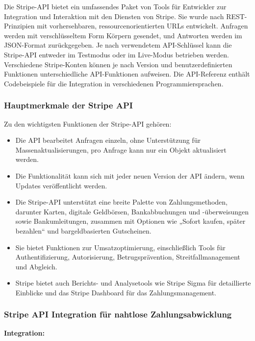 Die Stripe-API bietet ein umfassendes Paket von Tools für Entwickler zur Integration und Interaktion mit den Diensten von Stripe. Sie wurde nach REST-Prinzipien mit vorhersehbaren, ressourcenorientierten URLs entwickelt. Anfragen werden mit verschlüsseltem Form Körpern gesendet, und Antworten werden im JSON-Format zurückgegeben. Je nach verwendetem API-Schlüssel kann die Stripe-API entweder im Testmodus oder im Live-Modus betrieben werden. Verschiedene Stripe-Konten können je nach Version und benutzerdefinierten Funktionen unterschiedliche API-Funktionen aufweisen. Die API-Referenz enthält Codebeispiele für die Integration in verschiedenen Programmiersprachen\cite{Stripe-API:o.J}.

\subsubsection{Hauptmerkmale der Stripe API}
Zu den wichtigsten Funktionen der Stripe-API gehören:

\begin{itemize}
	\item Die API bearbeitet Anfragen einzeln, ohne Unterstützung für Massenaktualisierungen, pro Anfrage kann nur ein Objekt aktualisiert werden.
	\item Die Funktionalität kann sich mit jeder neuen Version der API ändern, wenn Updates veröffentlicht werden.
	\item Die Stripe-API unterstützt eine breite Palette von Zahlungsmethoden, darunter Karten, digitale Geldbörsen, Bankabbuchungen und -überweisungen sowie Bankumleitungen, zusammen mit Optionen wie „Sofort kaufen, später bezahlen“ und bargeldbasierten Gutscheinen.
	\item Sie bietet Funktionen zur Umsatzoptimierung, einschließlich Tools für Authentifizierung, Autorisierung, Betrugsprävention, Streitfallmanagement und Abgleich.
	\item Stripe bietet auch Berichts- und Analysetools wie Stripe Sigma für detaillierte Einblicke und das Stripe Dashboard für das Zahlungsmanagement\cite{Stripe-API:o.J}.
\end{itemize}

\subsubsection{Stripe API Integration für nahtlose Zahlungsabwicklung}

\textbf{Integration:} \\


